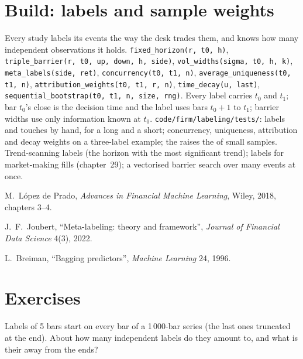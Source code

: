 \section{Build: labels and sample weights}\label{bld:ml:targets-labels-and-sample-weights:labeling}

\begin{build}
 Every study labels its events the way the desk trades them, and knows how many independent
observations it holds.
 \texttt{fixed\_horizon(r, t0, h)}, \texttt{triple\_barrier(r, t0, up, down, h, side)},
\texttt{vol\_widths(sigma, t0, h, k)}, \texttt{meta\_labels(side, ret)}, \texttt{concurrency(t0, t1, n)},
\texttt{average\_uniqueness(t0, t1, n)}, \texttt{attribution\_weights(t0, t1, r, n)}, \texttt{time\_decay(u, last)},
\texttt{sequential\_bootstrap(t0, t1, n, size, rng)}.
 Every label carries $t_0$ and $t_1$; bar $t_0$'s close is the decision time and the label uses bars
$t_0 + 1$ to $t_1$; barrier widths use only information known at $t_0$.
 \texttt{code/firm/labeling/tests/}: labels and touches by hand, for a long and a short;
concurrency, uniqueness, attribution and decay weights on a three-label example; the  raises the
 of small samples.
 Trend-scanning labels (the horizon with the most significant trend); labels for market-making fills
(chapter~29); a vectorised barrier search over many events at once.
\end{build}

\begin{omsources}
\item M.~López de Prado, \emph{Advances in Financial Machine Learning}, Wiley, 2018, chapters 3--4.
\item J.~F.~Joubert, ``Meta-labeling: theory and framework'', \emph{Journal of Financial Data Science} 4(3), 2022.
\item L.~Breiman, ``Bagging predictors'', \emph{Machine Learning} 24, 1996.
\end{omsources}

\section{Exercises}

\begin{exercise}[$\star$]\label{exo:ml:targets-labels-and-sample-weights:1}
Labels of 5 bars start on every bar of a 1\,000-bar series (the last ones truncated at the end). About how many
independent labels do they amount to, and what is their  away from the ends?
\end{exercise}

